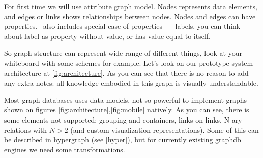 \secdown

For first time we will use attribute graph model. Nodes represents data
elements, and edges or links shows relationships between nodes. Nodes and edges
can have properties. \neo\ also includes special case of properties\ --- labels,
you can think about label as property without value, or has value equal to
itself.

So graph structure can represent wide range of different things, look at your
whiteboard with some schemes for example. Let’s look on our prototype system
architecture at \autoref{fig:architecture}. As you can see that there is no
reason to add any extra notes: all knowledge embodied in this graph is visually
understandable.



\clearpage

\secdown

Most graph databases uses data models, not so powerful to implement graphs shown
on figures \autoref{fig:architecture},\autoref{fig:mobile} natively. As you can
see, there is some elements not supported: grouping and containers, links on
links, N-ary relations with \mbox{$N>2$} (and custom visualization
representations). Some of this can be described in hypergraph (see
\autoref{hyper}), but for currently existing graphdb engines we need some
transformations.


\secup



\secup
